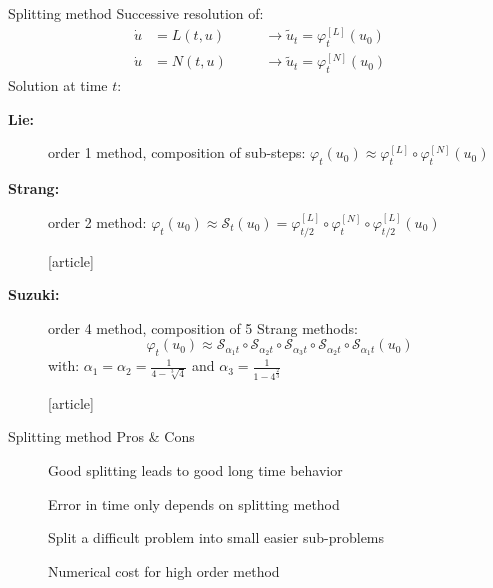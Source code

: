 \documentclass{beamer}
\newcommand{\cmark}{{\color{dgreen}\ding{52}}}
\newcommand{\xmark}{{\color{mred}\ding{55}}}
\newcommand{\mbold}[1]{{\textbf{\color{PLB}#1}}}
\newcommand{\customcite}[1]{\cite{#1}}
\begin{document}
\begin{frame}{Splitting method}
  Successive resolution of:
  $$
    \begin{aligned}
      \dot{u} &= L(t,u) \qquad & \rightarrow \tilde{u}_t = \varphi^{[L]}_t(u_0) \\
      \dot{u} &= N(t,u)        & \rightarrow \tilde{u}_t = \varphi^{[N]}_t(u_0)
    \end{aligned}
  $$
  Solution at time $t$:
  \begin{description}
    \item[\mbold{Lie:}] order 1 method, composition of sub-steps:
        $\varphi_t(u_0) \approx \varphi_t^{[L]} \circ \varphi_t^{[N]}(u_0)$
    \item[\mbold{Strang:}] order 2 method:
        $\varphi_t(u_0) \approx \mathcal{S}_t(u_0) = \varphi_{t/2}^{[L]} \circ \varphi_t^{[N]} \circ \varphi_{t/2}^{[L]} (u_0)$
        \vspace{-0.25cm}
        \begin{thebibliography}{9}
          [article]
           \customcite{Strang:1968}
        \end{thebibliography}
    \item[\mbold{Suzuki:}] order 4 method, composition of 5 Strang methods:
        $$\varphi_t(u_0) \approx \mathcal{S}_{\alpha_1t}\circ\mathcal{S}_{\alpha_2t}\circ\mathcal{S}_{\alpha_3t}\circ\mathcal{S}_{\alpha_2t}\circ\mathcal{S}_{\alpha_1t}(u_0)$$
        with:
        $\alpha_1 = \alpha_2 = \frac{1}{4-\sqrt[3]{4}}$ and $\alpha_3 = \frac{1}{1-4^{\frac{2}{3}}}$
        \vspace{-0.25cm}
        \begin{thebibliography}{9}
          [article]
           \customcite{Suzuki:1990}
        \end{thebibliography}
  \end{description}
\end{frame}
\begin{frame}{Splitting method}
  {Pros \& Cons}
  \begin{description}
    \item[\cmark] Good splitting leads to good long time behavior
    \item[\cmark] Error in time only depends on splitting method
    \item[\cmark] Split a difficult problem into small easier sub-problems
    \item[\xmark] Numerical cost for high order method
  \end{description}
  
\end{frame}
\end{document}
